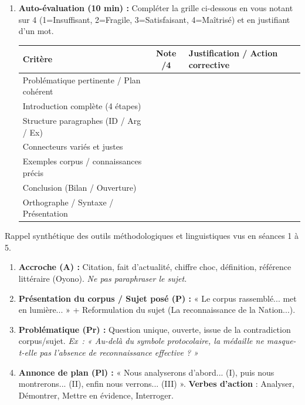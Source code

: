 \documentclass[11pt]{article}
\newcommand{\cle}[1]{{\popxbold\color{popdark}#1}}
\newcounter{popsec}
\newcounter{popsub}
\newcommand{\courssub}[1]{%
  \stepcounter{popsub}%
  \par\vspace{9pt}\noindent{\popxbold\fontsize{11.5}{13}\selectfont\color{popink}{\color{poporange}\thepopsec.\thepopsub}\hspace{6pt}#1}\par\nopagebreak\vspace{4pt}
}
\begin{document}
\begin{enumerate}
\begin{itemize}
    \end{itemize}
    \item \textbf{Auto-évaluation (10 min) :} Compléter la grille ci-dessous en vous notant sur 4 (1=Insuffisant, 2=Fragile, 3=Satisfaisant, 4=Maîtrisé) et en justifiant d'un mot.
    \begin{center}
    \begin{tabularx}{\linewidth}{|l|c|X|}\hline
    \rowcolor{popblueL} \textbf{Critère} & \textbf{Note /4} & \textbf{Justification / Action corrective} \\ \hline
    Problématique pertinente / Plan cohérent & & \\ \hline
    Introduction complète (4 étapes) & & \\ \hline
    Structure paragraphes (ID / Arg / Ex) & & \\ \hline
    Connecteurs variés et justes & & \\ \hline
    Exemples corpus / connaissances précis & & \\ \hline
    Conclusion (Bilan / Ouverture) & & \\ \hline
    Orthographe / Syntaxe / Présentation & & \\ \hline
    \end{tabularx}
    \end{center}
\end{enumerate}

\courssub{Ressources à mobiliser}
\noindent Rappel synthétique des outils méthodologiques et linguistiques vus en séances 1 à 5.

\begin{methode}
\begin{enumerate}
    \item \textbf{Accroche (A) :} Citation, fait d'actualité, chiffre choc, définition, référence littéraire (Oyono). \textit{Ne pas paraphraser le sujet.}
    \item \textbf{Présentation du corpus / Sujet posé (P) :} « Le corpus rassemblé... met en lumière... » + Reformulation du sujet (\cle{La reconnaissance de la Nation...}).
    \item \textbf{Problématique (Pr) :} Question unique, ouverte, issue de la contradiction corpus/sujet. \textit{Ex~: « Au-delà du symbole protocolaire, la médaille ne masque-t-elle pas l'absence de reconnaissance effective ? »}
    \item \textbf{Annonce de plan (Pl) :} « Nous analyserons d'abord... (I), puis nous montrerons... (II), enfin nous verrons... (III) ». \textbf{Verbes d'action} : Analyser, Démontrer, Mettre en évidence, Interroger.
\end{enumerate}
\end{methode}
\end{document}
